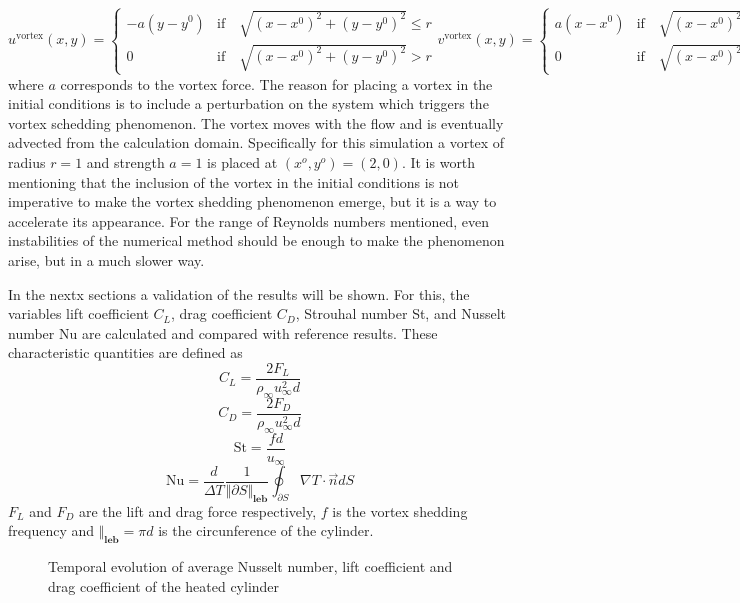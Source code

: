 {
\begin{subequations}
\begin{equation}
	u^{\text{vortex}}(x,y) = 
	\begin{cases}
		-a(y-y^0) & \text{if} \quad\sqrt{(x-x^0)^2+(y-y^0)^2} \leq r \\
		0 & \text{if} \quad\sqrt{(x-x^0)^2+(y-y^0)^2} > r
	\end{cases}
\end{equation}
\begin{equation}
	v^{\text{vortex}}(x,y) = 
	\begin{cases}
		a(x-x^0) & \text{if} \quad\sqrt{(x-x^0)^2+(y-y^0)^2} \leq r \\
		0 & \text{if} \quad\sqrt{(x-x^0)^2+(y-y^0)^2} > r
	\end{cases}
\end{equation}	
\end{subequations}
}%
where $a$ corresponds to the vortex force. The reason for placing a vortex in the initial conditions is to include a perturbation on the system which triggers the vortex schedding phenomenon.  The vortex moves with the flow and is eventually advected from the calculation domain. Specifically for this simulation a vortex of radius $r=1$ and strength $a = 1$ is placed at $(x^o,y^o) = ( 2,0)$. It is  worth mentioning that the inclusion of the vortex in the initial conditions is not imperative to make the vortex shedding phenomenon emerge, but it is a way to accelerate its appearance. For the range of Reynolds numbers mentioned, even instabilities of the numerical method should be enough to make the phenomenon arise, but in a much slower way. 

In the nextx sections a validation of the results will be shown. For this, the variables lift coefficient $C_L$, drag coefficient $C_D$, Strouhal number St, and Nusselt number Nu are calculated and compared with reference results. These characteristic quantities are defined as
\begin{equation} 
	C_L = \frac{2F_L}{\rho_\infty u^2_\infty d}
\end{equation}
\begin{equation}
	C_D = \frac{2F_D}{\rho_\infty u^2_\infty d}
\end{equation}
\begin{equation}
	\text{St} = \frac{fd}{u_\infty}
\end{equation}
\begin{equation}
	\text{Nu} = \frac{d}{\Delta T}\frac{1}{\Vert \partial S\Vert_{\textbf{leb}}}\oint_{\partial S} \nabla T \cdot \vec{n} dS
\end{equation}
$F_L$ and $F_D$ are the lift and drag force respectively, $f$ is the vortex shedding frequency and $\Vert_{\textbf{leb}} = \pi d$ is the circunference of the cylinder.
\begin{figure}[t]
	\centering	
	\caption{Temporal evolution of average Nusselt number, lift coefficient and drag coefficient of the heated cylinder}	\label{fig:HeatedCylinderResults}
\end{figure}
